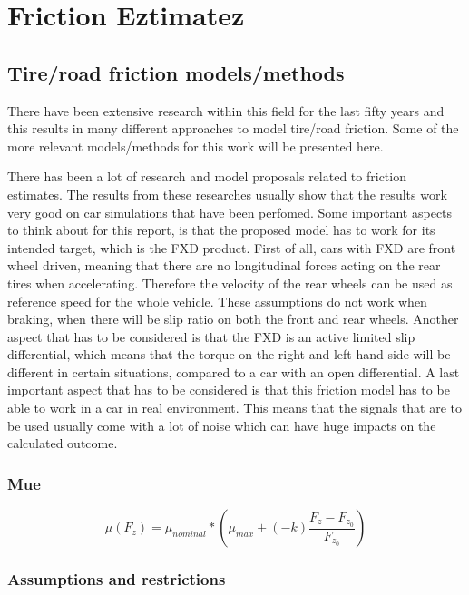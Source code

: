 \chapter{Friction Eztimatez}



\section{Tire/road friction models/methods}

There have been extensive research within this field for the last fifty years and this results in many different approaches to model tire/road friction. Some of the more relevant models/methods for this work will be presented here.

There has been a lot of research and model proposals related to friction estimates. The results from these researches usually show that the results work very good on car simulations that have been perfomed. Some important aspects to think about for this report, is that the proposed model has to work for its intended target, which is the FXD product. First of all, cars with FXD are front wheel driven, meaning that there are no longitudinal forces acting on the rear tires when accelerating. Therefore the velocity of the rear wheels can be used as reference speed for the whole vehicle. These assumptions do not work when braking, when there will be slip ratio on both the front and rear wheels. Another aspect that has to be considered is that the FXD is an active limited slip differential, which means that the torque on the right and left hand side will be different in certain situations, compared to a car with an open differential. A last important aspect that has to be considered is that this friction model has to be able to work in a car in real environment. This means that the signals that are to be used usually come with a lot of noise which can have huge impacts on the calculated outcome.

\subsection{Mue}

\begin{equation}
\mu(F_{z})=\mu_{nominal}*(\mu_{max} + (-k)\frac{F_{z} - F_{z_{0}}}{F_{z_{0}}})
\end{equation}

\subsection{Assumptions and restrictions}




